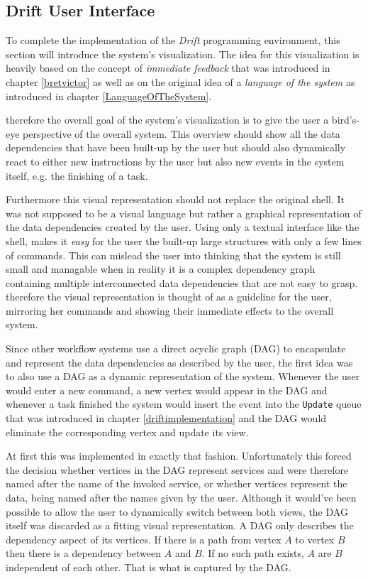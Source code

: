 \subsection{Drift User Interface}
\label{driftui}

To complete the implementation of the \textit{Drift} programming
environment, this section will introduce the system's visualization.
The idea for this visualization is heavily based on the concept
of \textit{immediate feedback} that was introduced in chapter \ref{bretvictor}
as well as on the original idea of a \textit{language of the system}
as introduced in chapter \ref{LanguageOfTheSystem}.

therefore the overall goal of the system's visualization is to
give the user a bird's-eye perspective of the overall system.
This overview should show all the data dependencies that have
been built-up by the user but should also dynamically react
to either new instructions by the user but also new events in
the system itself, e.g. the finishing of a task.

Furthermore this visual representation should not replace the
original shell. It was not supposed to be a visual language
but rather a graphical representation of the data
dependencies created by the user. Using only a textual interface
like the shell, makes it \textit{easy} for the user the built-up
large structures with only a few lines of commands. This can
mislead the user into thinking that the system is still small
and managable when in reality it is a complex dependency graph
containing multiple interconnected data dependencies that
are not easy to grasp. therefore the visual representation
is thought of as a guideline for the user, mirroring her commands
and showing their immediate effects to the overall system.
\newline

Since other workflow systems use a direct acyclic graph (DAG)
to encapsulate and represent the data dependencies as described
by the user, the first idea was to also use a DAG as a dynamic
representation of the system. Whenever the user would enter a new command,
a new vertex would appear in the DAG and whenever a task finished
the system would insert the event into the \texttt{Update} queue
that was introduced in chapter \ref{driftimplementation} and the
DAG would eliminate the corresponding vertex and update its view.

At first this was implemented in exactly that fashion. Unfortunately
this forced the decision whether vertices in the DAG represent
services and were therefore named after the name of the invoked
service, or whether vertices represent the data, being named after
the names given by the user. Although it would've been possible
to allow the user to dynamically switch between both views,
the DAG itself was discarded as a fitting visual representation.
A DAG only describes the dependency aspect of its vertices.
If there is a path from vertex $A$ to vertex $B$ then there is
a dependency between $A$ and $B$. If no such path exists, $A$
are $B$ independent of each other. That is what is captured by
the DAG.

